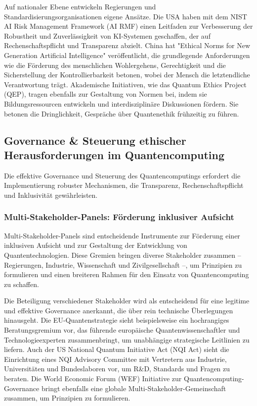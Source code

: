 Auf nationaler Ebene entwickeln Regierungen und Standardisierungsorganisationen eigene Ansätze. Die USA haben mit dem NIST AI Risk Management Framework (AI RMF) einen Leitfaden zur Verbesserung der Robustheit und Zuverlässigkeit von KI-Systemen geschaffen, der auf Rechenschaftspflicht und Transparenz abzielt. China hat "Ethical Norms for New Generation Artificial Intelligence" veröffentlicht, die grundlegende Anforderungen wie die Förderung des menschlichen Wohlergehens, Gerechtigkeit und die Sicherstellung der Kontrollierbarkeit betonen, wobei der Mensch die letztendliche Verantwortung trägt.\cite{noauthor_ethical_nodate}\cite{noauthor_nist_nodate} Akademische Initiativen, wie das Quantum Ethics Project (QEP), tragen ebenfalls zur Gestaltung von Normen bei, indem sie Bildungsressourcen entwickeln und interdisziplinäre Diskussionen fördern. Sie betonen die Dringlichkeit, Gespräche über Quantenethik frühzeitig zu führen. \cite{arrow_holistic_2023}


\subsection{Governance \& Steuerung ethischer Herausforderungen im Quantencomputing}
Die effektive Governance und Steuerung des Quantencomputings erfordert die Implementierung robuster Mechanismen, die Transparenz, Rechenschaftspflicht und Inklusivität gewährleisten.


\subsubsection{Multi-Stakeholder-Panels: Förderung inklusiver Aufsicht}
Multi-Stakeholder-Panels sind entscheidende Instrumente zur Förderung einer inklusiven Aufsicht und zur Gestaltung der Entwicklung von Quantentechnologien. Diese Gremien bringen diverse Stakeholder zusammen – Regierungen, Industrie, Wissenschaft und Zivilgesellschaft –, um Prinzipien zu formulieren und einen breiteren Rahmen für den Einsatz von Quantencomputing zu schaffen.

Die Beteiligung verschiedener Stakeholder wird als entscheidend für eine legitime und effektive Governance anerkannt, die über rein technische Überlegungen hinausgeht.\cite{noauthor_commission_nodate-2} Die EU-Quantenstrategie sieht beispielsweise ein hochrangiges Beratungsgremium vor, das führende europäische Quantenwissenschaftler und Technologieexperten zusammenbringt, um unabhängige strategische Leitlinien zu liefern.\cite{noauthor_commission_nodate-2} Auch der US National Quantum Initiative Act (NQI Act) sieht die Einrichtung eines NQI Advisory Committee mit Vertretern aus Industrie, Universitäten und Bundeslaboren vor, um R\&D, Standards und Fragen zu beraten.\cite{noauthor_national_nodate} Die World Economic Forum (WEF) Initiative zur Quantencomputing-Governance bringt ebenfalls eine globale Multi-Stakeholder-Gemeinschaft zusammen, um Prinzipien zu formulieren.\cite{noauthor_quantum_nodate-8} 

